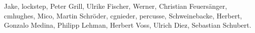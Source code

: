 Jake, %
lockstep, %
Peter Grill, %
Ulrike Fischer, %
Werner, %
Christian Feuersänger, %
cmhughes, %
Mico, %
Martin Schröder, %
cgnieder, %
percusse, %
Schweinebacke, %
Herbert, %
Gonzalo Medina, %
Philipp Lehman, %
Herbert Voss,
Ulrich Diez,
Sebastian Schubert.


